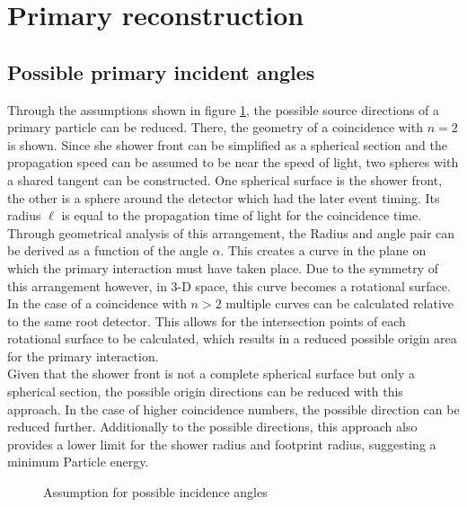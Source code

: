 \documentclass[abstract,toc,los,english,10pt,glossary,acronyms]{jluthesis}
\begin{document}
\section{Primary reconstruction}
\subsection{Possible primary incident angles}
Through the assumptions shown in figure \ref{fig:angle-assumptions}, the possible source directions of a primary particle can be reduced. There, the geometry of a coincidence with $n=2$ is shown. Since she shower front can be simplified as a spherical section and the propagation speed can be assumed to be near the speed of light, two spheres with a shared tangent can be constructed. One spherical surface is the shower front, the other is a sphere around the detector which had the later event timing. Its radius $\ell$ is equal to the propagation time of light for the coincidence time. Through geometrical analysis of this arrangement, the Radius and angle pair can be derived as a function of the angle $\alpha$. This creates a curve in the plane on which the primary interaction must have taken place. Due to the symmetry of this arrangement however, in 3-D space, this curve becomes a rotational surface. \\
In the case of a coincidence with $n>2$ multiple curves can be calculated relative to the same root detector. This allows for the intersection points of each rotational surface to be calculated, which results in a reduced possible origin area for the primary interaction. \\
Given that the shower front is not a complete spherical surface but only a spherical section, the possible origin directions can be reduced with this approach. In the case of higher coincidence numbers, the possible direction can be reduced further. Additionally to the possible directions, this approach also provides a lower limit for the shower radius and footprint radius, suggesting a minimum Particle energy.
\begin{figure}[ht!]
	\centering
	\caption{Assumption for possible incidence angles}
	\label{fig:angle-assumptions}
\end{figure}
\end{document}
